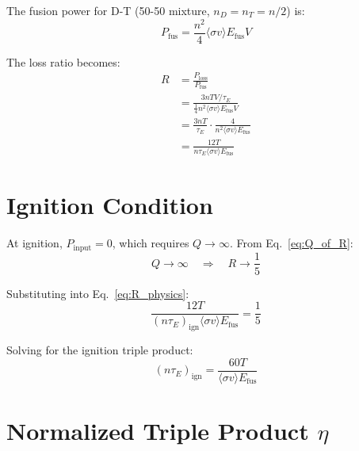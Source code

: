 \documentclass[11pt,a4paper]{article}
\begin{document}
The fusion power for D-T (50-50 mixture, $n_D = n_T = n/2$) is:
\begin{equation}
P_{\text{fus}} = \frac{n^2}{4} \langle\sigma v\rangle E_{\text{fus}} V
\label{eq:P_fus}
\end{equation}

The loss ratio becomes:
\begin{align}
R &= \frac{P_{\text{loss}}}{P_{\text{fus}}} \nonumber \\
  &= \frac{3nTV / \tau_E}{\frac{1}{4} n^2 \langle\sigma v\rangle E_{\text{fus}} V} \nonumber \\
  &= \frac{3nT}{\tau_E} \cdot \frac{4}{n^2 \langle\sigma v\rangle E_{\text{fus}}} \nonumber \\
  &= \frac{12T}{n \tau_E \langle\sigma v\rangle E_{\text{fus}}}
\label{eq:R_physics}
\end{align}

\section{Ignition Condition}

At ignition, $P_{\text{input}} = 0$, which requires $Q \to \infty$. From Eq.~\eqref{eq:Q_of_R}:
\begin{equation}
Q \to \infty \quad \Rightarrow \quad R \to \frac{1}{5}
\end{equation}

Substituting into Eq.~\eqref{eq:R_physics}:
\begin{equation}
\frac{12T}{(n \tau_E)_{\text{ign}} \langle\sigma v\rangle E_{\text{fus}}} = \frac{1}{5}
\end{equation}

Solving for the ignition triple product:
\begin{equation}
(n \tau_E)_{\text{ign}} = \frac{60T}{\langle\sigma v\rangle E_{\text{fus}}}
\label{eq:ignition}
\end{equation}

\section{Normalized Triple Product $\eta$}
\end{document}
